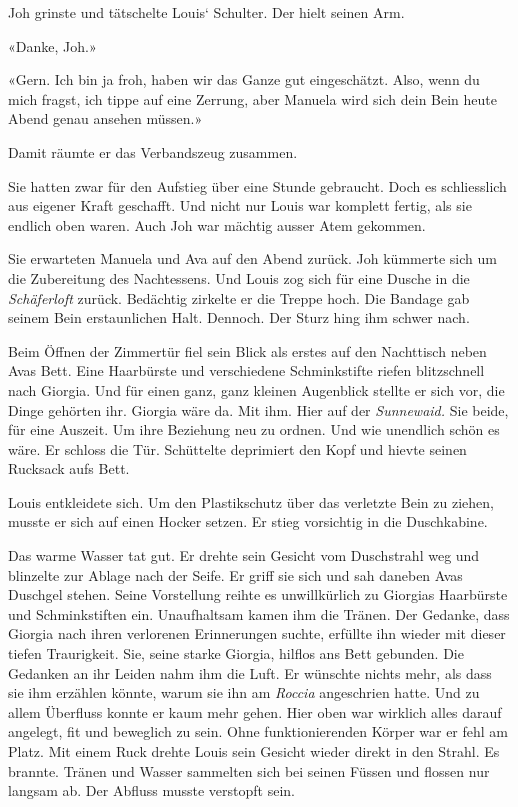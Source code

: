 Joh grinste und tätschelte Louis` Schulter. Der hielt seinen Arm.

«Danke, Joh.»

«Gern. Ich bin ja froh, haben wir das Ganze gut eingeschätzt. Also, wenn
du mich fragst, ich tippe auf eine Zerrung, aber Manuela wird sich dein
Bein heute Abend genau ansehen müssen.»

Damit räumte er das Verbandszeug zusammen.

Sie hatten zwar für den Aufstieg über eine Stunde gebraucht. Doch es
schliesslich aus eigener Kraft geschafft. Und nicht nur Louis war
komplett fertig, als sie endlich oben waren. Auch Joh war mächtig ausser
Atem gekommen.

Sie erwarteten Manuela und Ava auf den Abend zurück. Joh kümmerte sich
um die Zubereitung des Nachtessens. Und Louis zog sich für eine Dusche
in die \emph{Schäferloft} zurück. Bedächtig zirkelte er die Treppe hoch.
Die Bandage gab seinem Bein erstaunlichen Halt. Dennoch. Der Sturz hing
ihm schwer nach.

Beim Öffnen der Zimmertür fiel sein Blick als erstes auf den Nachttisch
neben Avas Bett. Eine Haarbürste und verschiedene Schminkstifte riefen
blitzschnell nach Giorgia. Und für einen ganz, ganz kleinen Augenblick
stellte er sich vor, die Dinge gehörten ihr. Giorgia wäre da. Mit ihm.
Hier auf der \emph{Sunnewaid.} Sie beide, für eine Auszeit. Um ihre
Beziehung neu zu ordnen. Und wie unendlich schön es wäre. Er schloss die
Tür. Schüttelte deprimiert den Kopf und hievte seinen Rucksack aufs
Bett.

Louis entkleidete sich. Um den Plastikschutz über das verletzte Bein zu
ziehen, musste er sich auf einen Hocker setzen. Er stieg vorsichtig in
die Duschkabine.

Das warme Wasser tat gut. Er drehte sein Gesicht vom Duschstrahl weg und
blinzelte zur Ablage nach der Seife. Er griff sie sich und sah daneben
Avas Duschgel stehen. Seine Vorstellung reihte es unwillkürlich zu
Giorgias Haarbürste und Schminkstiften ein. Unaufhaltsam kamen ihm die
Tränen. Der Gedanke, dass Giorgia nach ihren verlorenen Erinnerungen
suchte, erfüllte ihn wieder mit dieser tiefen Traurigkeit. Sie, seine
starke Giorgia, hilflos ans Bett gebunden. Die Gedanken an ihr Leiden
nahm ihm die Luft. Er wünschte nichts mehr, als dass sie ihm erzählen
könnte, warum sie ihn am \emph{Roccia} angeschrien hatte. Und zu allem
Überfluss konnte er kaum mehr gehen. Hier oben war wirklich alles darauf
angelegt, fit und beweglich zu sein. Ohne funktionierenden Körper war er
fehl am Platz. Mit einem Ruck drehte Louis sein Gesicht wieder direkt in
den Strahl. Es brannte. Tränen und Wasser sammelten sich bei seinen
Füssen und flossen nur langsam ab. Der Abfluss musste verstopft sein.

